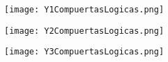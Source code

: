 \begin{figure}[htb] 
  \texttt{[image: Y1CompuertasLogicas.png]}
\end{figure}

\begin{figure}[htb] 
  \texttt{[image: Y2CompuertasLogicas.png]}
\end{figure}

\begin{figure}[htb] 
  \texttt{[image: Y3CompuertasLogicas.png]}
\end{figure}

